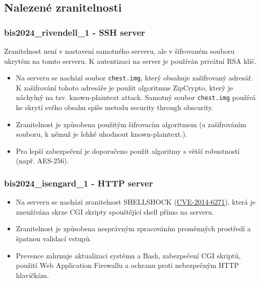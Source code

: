 \documentclass[a4paper, 11pt]{article}
\begin{document}
\subsection{Nalezené zranitelnosti}
\subsubsection{bis2024\_rivendell\_1 - SSH server}
Zranitelnost není v nastavení samotného serveru, ale v šifrovaném souboru ukrytém na tomto serveru. K autentizaci na server je používán privátní RSA klíč. 

\begin{itemize}
    \item Na serveru se nachází soubor \texttt{chest.img}, který obsahuje zašifrovaný adresář. K zašifrování tohoto adresáře je použit algoritmus ZipCrypto, který je náchylný na tzv. known-plaintext attack. Samotný soubor \texttt{chest.img} používá ke skrytí svého obsahu spíše metodu security through obscurity.
    \item Zranitelnost je způsobena použitým šifrovacím algoritmem (a zašifrováním souboru, k němuž je lehké uhodnout known-plaintext.).
    \item Pro lepší zabezpečení je doporučeno použít algoritmy s větší robustností (např. AES-256).
\end{itemize}


\subsubsection{bis2024\_isengard\_1 - HTTP server}
\begin{itemize}
    \item Na serveru se nachází zranitelnost SHELLSHOCK (\href{https://nvd.nist.gov/vuln/detail/cve-2014-6271}{CVE-2014-6271}), která je zneužívána skrze CGI skripty spouštějící shell přímo na serveru.
    \item Zranitelnost je způsobena nesprávným zpracováním proměnných prostředí a špatnou validací vstupů.
    \item Prevence zahrnuje aktualizaci systému a Bash, zabezpečení CGI skriptů, použití Web Application \mbox{Firewallu} a ochranu proti nebezpečným HTTP hlavičkám.
\end{itemize}
\end{document}
